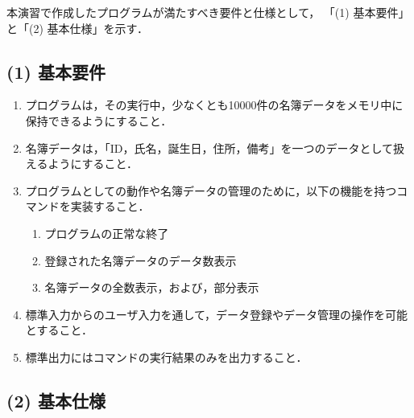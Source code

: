 本演習で作成したプログラムが満たすべき要件と仕様として，
「(1) 基本要件」と「(2) 基本仕様」を示す．

\subsection*{(1) 基本要件}

\begin{enumerate}
  \item プログラムは，その実行中，少なくとも10000件の名簿データをメモリ中に保持できるようにすること．
  \item 名簿データは，「ID，氏名，誕生日，住所，備考」を一つのデータとして扱えるようにすること．
  \item プログラムとしての動作や名簿データの管理のために，以下の機能を持つコマンドを実装すること．
  \begin{enumerate}
    \item プログラムの正常な終了
    \item 登録された名簿データのデータ数表示
    \item 名簿データの全数表示，および，部分表示
  \end{enumerate}
  \item 標準入力からのユーザ入力を通して，データ登録やデータ管理の操作を可能とすること．
  \item 標準出力にはコマンドの実行結果のみを出力すること．      %
\end{enumerate}

\subsection*{(2) 基本仕様}


